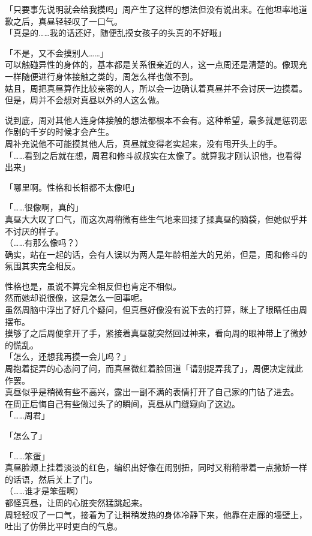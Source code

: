 「只要事先说明就会给我摸吗」周产生了这样的想法但没有说出来。在他坦率地道歉之后，真昼轻轻叹了一口气。\\

「真是的……我的话还好，随便乱摸女孩子的头真的不好哦」

「不是，又不会摸别人……」\\

可以触碰异性的身体的，基本都是关系很亲近的人，这一点周还是清楚的。像现充一样随便进行身体接触之类的，周怎么样也做不到。\\

姑且，周把真昼算作比较亲密的人，所以会一边确认着真昼并不会讨厌一边摸着。但是，周并不会想对真昼以外的人这么做。

说到底，周对其他人连身体接触的想法都根本不会有。这种希望，最多就是惩罚恶作剧的千岁的时候才会产生。\\

周补充说他不可能摸其他人后，真昼就变得老实起来，没有甩开头上的手。\\

「……看到之后就在想，周君和修斗叔叔实在太像了。就算我才刚认识他，也看得出来」

「哪里啊。性格和长相都不太像吧」

「……很像啊，真的」\\

真昼大大叹了口气，而这次周稍微有些生气地来回揉了揉真昼的脑袋，但她似乎并不讨厌的样子。\\

（……有那么像吗？）\\

确实，站在一起的话，会有人误以为两人是年龄相差大的兄弟，但是，周和修斗的氛围其实完全相反。

性格也是，虽说不算完全相反但也肯定不相似。\\

然而她却说很像，这是怎么一回事呢。\\

虽然周脑中浮出了好几个疑问，但真昼好像没有说下去的打算，眯上了眼睛任由周摆布。\\

摸够了之后周便拿开了手，紧接着真昼就突然回过神来，看向周的眼神带上了微妙的慌乱。\\

「怎么，还想我再摸一会儿吗？」\\

周抱着捉弄的心态问了问，而真昼微红着脸回道「请别捉弄我了」，周便决定就此作罢。\\

真昼似乎是稍微有些不高兴，露出一副不满的表情打开了自己家的门钻了进去。\\

在周正后悔自己有些做过头了的瞬间，真昼从门缝窥向了这边。\\

「……周君」

「怎么了」

「……笨蛋」\\

真昼脸颊上挂着淡淡的红色，编织出好像在闹别扭，同时又稍稍带着一点撒娇一样的话语，然后关上了门。\\

（……谁才是笨蛋啊）\\

都怪真昼，让周的心脏突然猛跳起来。\\

周轻轻叹了一口气，接着为了让稍稍发热的身体冷静下来，他靠在走廊的墙壁上，吐出了仿佛比平时更白的气息。
